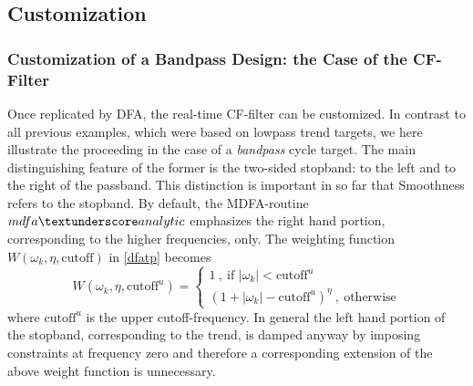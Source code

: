 \documentclass[a4paper]{book}
\begin{document}
\subsection{Customization}\label{customization_cf}

\subsubsection{Customization of a Bandpass Design: the Case of the CF-Filter}

Once replicated by DFA, the real-time CF-filter can be customized. In contrast to all previous examples, which were based on lowpass trend targets, we here illustrate the proceeding in the case of a \emph{bandpass} cycle target. The main distinguishing feature of the former is the two-sided stopband: to the left and to the right of the passband. This distinction is important in so far that Smoothness refers to the stopband. By default, the MDFA-routine $mdfa\textunderscore analytic$ emphasizes the right hand portion, corresponding to the higher frequencies, only. The weighting function $W(\omega_k,\eta,\textrm{cutoff})$ in \ref{dfatp} becomes
\[
W(\omega_k,\eta,\textrm{cutoff}^u)=\left\{\begin{array}{cc}
1~,~\textrm{if~} |\omega_k|<\textrm{cutoff}^u\\
(1+|\omega_k|-\textrm{cutoff}^u)^{\eta}~,~\textrm{otherwise}
\end{array}\right.
\]
where $\textrm{cutoff}^u$ is the upper cutoff-frequency. In general the left hand portion of the stopband, corresponding to the trend, is damped anyway by imposing constraints at frequency zero and therefore a corresponding extension of the above weight function is unnecessary. \\
\end{document}
